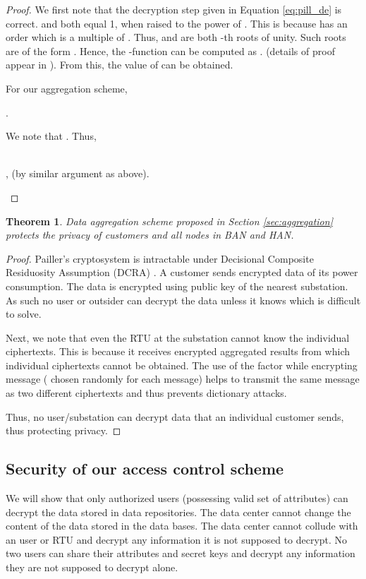 \documentclass[conference]{IEEEtran}[10pt]
\newtheorem{theorem}{Theorem}
\begin{document}
\begin{proof}
We first note that the decryption step given in Equation \ref{eq:pill_de} is correct. 
 and  both equal 1, when raised to the power of . This is because  has an order which is a 
multiple of . 
Thus,   and  are both -th roots of unity. 
Such  roots are of the form . 
Hence, the -function can be computed as . 
(details of proof appear in \cite{P99}).
From this, the value of  can be obtained. 

For our aggregation scheme, 
\begin{center}
.   
\end{center}
We note that . 
Thus, 
\begin{center}
  \\
\vspace*{.1cm}
, (by similar argument as above). 
\end{center}
\end{proof}


\begin{theorem}
Data aggregation scheme proposed in Section \ref{sec:aggregation} protects the privacy of customers and all nodes in BAN and HAN. 
\end{theorem}

\begin{proof}
Pailler's cryptosystem is intractable under Decisional Composite
Residuosity Assumption (DCRA) \cite{P99}. 
A customer sends encrypted data of its power consumption. 
The data is encrypted using public key of the nearest substation. 
As such no user or outsider can decrypt the data unless it knows  which is difficult to solve.  

Next, we note that even the RTU at the substation cannot know the individual ciphertexts. 
This is because it receives encrypted aggregated results from which individual ciphertexts cannot be obtained. 
The use of the factor  while encrypting message ( chosen randomly for each message) helps to transmit
the same message as two different ciphertexts and thus prevents dictionary attacks. 

Thus, no user/substation can decrypt data that an individual customer sends, thus protecting privacy. 
\end{proof}


\subsection{Security of our access control scheme}
\label{subsec:security-abe}
We will show that only authorized users (possessing valid set of attributes) can decrypt the data stored in data repositories. 
The data center cannot change the content of the data stored in the data bases. 
The data center cannot collude with an user or RTU and decrypt any information it is not supposed to decrypt.
No two users can share their attributes and secret keys and decrypt any information they are not supposed to decrypt alone. 
\end{document}
